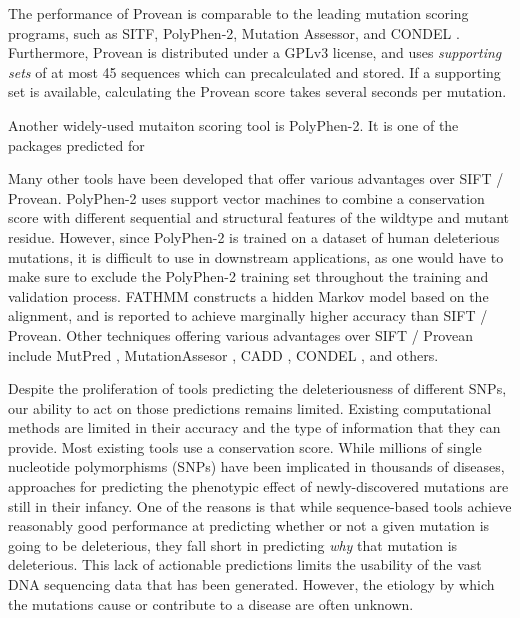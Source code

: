 The performance of Provean is comparable to the leading mutation scoring programs, such as SITF, PolyPhen-2, Mutation Assessor, and CONDEL \cite{choi_predicting_2012}. Furthermore, Provean is distributed under a GPLv3 license, and uses \textit{supporting sets} of at most 45 sequences which can precalculated and stored. If a supporting set is available, calculating the Provean score takes several seconds per mutation.

Another widely-used mutaiton scoring tool is PolyPhen-2. It is one of the packages predicted for

Many other tools have been developed that offer various advantages over SIFT / Provean. PolyPhen-2 \cite{adzhubei_predicting_2001} uses support vector machines to combine a conservation score with different sequential and structural features of the wildtype and mutant residue. However, since PolyPhen-2 is trained on a dataset of human deleterious mutations, it is difficult to use in downstream applications, as one would have to make sure to exclude the PolyPhen-2 training set throughout the training and validation process. FATHMM \cite{shihab_ranking_2014} constructs a hidden Markov model based on the alignment, and is reported to achieve marginally higher accuracy than SIFT / Provean. Other techniques offering various advantages over SIFT / Provean include MutPred \cite{li_automated_2009}, MutationAssesor \cite{network_integrated_2011}, CADD \cite{kircher_general_2014}, CONDEL \cite{choi_predicting_2012}, and others.

Despite the proliferation of tools predicting the deleteriousness of different SNPs, our ability to act on those predictions remains limited. Existing computational methods are limited in their accuracy and the type of information that they can provide. Most existing tools use a conservation score. While millions of single nucleotide polymorphisms (SNPs) have been implicated in thousands of diseases, approaches for predicting the phenotypic effect of newly-discovered mutations are still in their infancy. One of the reasons is that while sequence-based tools achieve reasonably good performance at predicting whether or not a given mutation is going to be deleterious, they fall short in predicting \textit{why} that mutation is deleterious. This lack of actionable predictions limits the usability of the vast DNA sequencing data that has been generated. However, the etiology by which the mutations cause or contribute to a disease are often unknown.



